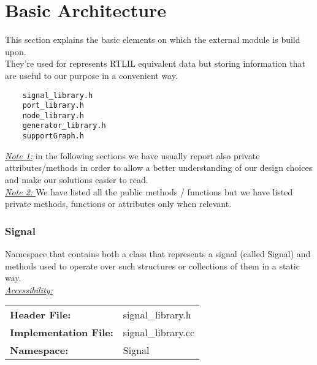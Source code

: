 \documentclass{article}
\newcommand{\sectionbreak}{\clearpage}
\begin{document}
\part{Basic Architecture}

This section explains the basic elements on which the external module is build upon.\\
They're used for represents RTLIL equivalent data but storing information that are useful to our purpose in a convenient way.\\

\begin{mdframed}[hidealllines=true, backgroundcolor=dkgreen!10]
	\begin{lstlisting}
	signal_library.h
	port_library.h
	node_library.h
	generator_library.h
	supportGraph.h
	\end{lstlisting}
\end{mdframed}

\underline{\textit{Note 1:}} in the following sections we have usually report also private attributes/methods in order to allow a better understanding of our design choices and make our solutions easier to read.\\

\textit{\underline{Note 2: }} We have listed all the public methods / functions but we have listed private methods, functions or attributes only when relevant.\\

\sectionbreak{\clearpage}


\section{Signal}

Namespace that contains both a class that represents a signal (called Signal) and methods used to operate over such structures or 
collections of them in a static way.\\

\underline{\textit{\underline{Accessibility: }}}\\

\begin{tabular}{ll}
	\textbf{Header File:} & signal\_library.h\\
	\textbf{Implementation File:} & signal\_library.cc\\
	\textbf{Namespace: } & Signal\\
\end{tabular}\\
\end{document}
